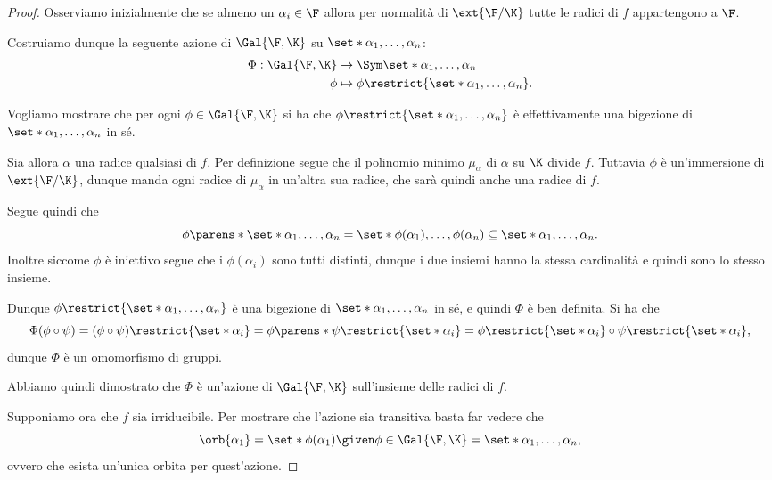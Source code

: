 \begin{proof}
    Osserviamo inizialmente che se almeno un $\alpha_i \in \F$ allora per normalità di $\ext{\F / \K}$ tutte le radici di $f$ appartengono a $\F$.
    
    Costruiamo dunque la seguente azione di $\Gal{\F, \K}$ su $\set*{\alpha_1, \dots, \alpha_n}$:
    \begin{equation}\label{eq:gal_action}
        \begin{aligned}
           \Phi : \Gal{\F, \K} &\to \Sym \set*{\alpha_1, \dots, \alpha_n}\\
            \phi &\mapsto \phi\restrict{\set*{\alpha_1, \dots, \alpha_n}}. 
        \end{aligned}
    \end{equation}

     Vogliamo mostrare che per ogni $\phi \in \Gal{\F, \K}$ si ha che $\phi\restrict{\set*{\alpha_1, \dots, \alpha_n}}$ è effettivamente una bigezione di $\set*{\alpha_1, \dots, \alpha_n}$ in sé.
    
    Sia allora $\alpha$ una radice qualsiasi di $f$. Per definizione segue che il polinomio minimo $\mu_\alpha$ di $\alpha$ su $\K$ divide $f$. Tuttavia $\phi$ è un'immersione di $\ext{\F / \K}$, dunque manda ogni radice di $\mu_\alpha$ in un'altra sua radice, che sarà quindi anche una radice di $f$.

    Segue quindi che \[
        \phi\parens*{\set*{\alpha_1, \dots, \alpha_n}} 
        = \set*{\phi(\alpha_1), \dots, \phi(\alpha_n)} 
        \subseteq \set*{\alpha_1, \dots, \alpha_n}.
    \] Inoltre siccome $\phi$ è iniettivo segue che i $\phi(\alpha_i)$ sono tutti distinti, dunque i due insiemi hanno la stessa cardinalità e quindi sono lo stesso insieme. 
    
    Dunque $\phi\restrict{\set*{\alpha_1, \dots, \alpha_n}}$ è una bigezione di $\set*{\alpha_1, \dots, \alpha_n}$ in sé, e quindi $\Phi$ è ben definita.
     Si ha che \[
        \Phi(\phi \circ \psi) 
        = (\phi \circ \psi)\restrict{\set*{\alpha_i}} 
        = \phi\parens*{\psi\restrict{\set*{\alpha_i}}} 
        = \phi\restrict{\set*{\alpha_i}} \circ \psi\restrict{\set*{\alpha_i}},
    \] dunque $\Phi$ è un omomorfismo di gruppi.

    Abbiamo quindi dimostrato che $\Phi$ è un'azione di $\Gal{\F, \K}$ sull'insieme delle radici di $f$. 
    
    Supponiamo ora che $f$ sia irriducibile. Per mostrare che l'azione sia transitiva basta far vedere che \[
        \orb{\alpha_1} = \set*{\phi(\alpha_1) \given \phi \in \Gal{\F, \K}} = \set*{\alpha_1, \dots, \alpha_n},
    \] ovvero che esista un'unica orbita per quest'azione.
    

\end{proof}

